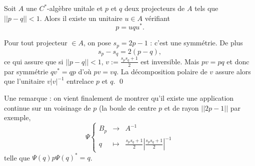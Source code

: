 \begin{lem}\label{conj}
Soit $A$ une $C^*$-algèbre unitale et $p$ et $q$ deux projecteurs de $A$ tels que $||p-q||<1$. Alors il existe un unitaire $u\in A$ vérifiant
\[p=uqu^*.\]
\end{lem}

\begin{dem}
Pour tout projecteur $\in A$, on pose $s_p = 2p-1$ : c'est une symmétrie. De plus 
\[s_p-s_q = 2(p-q),\]
ce qui assure que si $||p-q||<1$, $v:= \frac{s_p s_q+1}{2}$ est inversible. Mais $pv=pq$ et donc par symmétrie $qv^* = qp$ d'où $pv=vq$. La décomposition polaire de $v$ assure alors que l'unitaire $v |v|^{-1}$ entrelace $p$ et $q$.
\qed\\
\end{dem}
Une remarque : on vient finalement de montrer qu'il existe une application continue sur un voisinage de $p$ (la boule de centre $p$ et de rayon $||2p-1||$ par exemple,
\[\Psi\left\{\begin{array}{rcl} B_p &\rightarrow & A^{-1} \\
 q & \mapsto &  \frac{s_p s_q +1}{2}|\frac{s_p s_q +1}{2}|^{-1}		
\end{array}\right.\]
telle que $\Psi(q) p \Psi(q)^* = q$. \\


